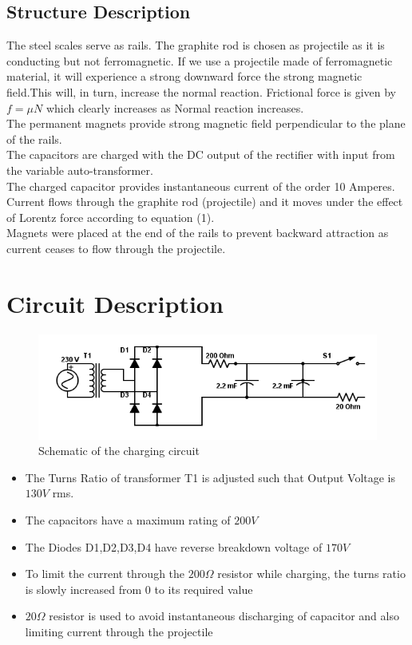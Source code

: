 \documentclass[twocolumn]{article}
\begin{document}
\subsection*{Structure Description}
\hspace{10mm}The steel scales serve as rails. The graphite rod is chosen as projectile as it is conducting but not ferromagnetic. If we use a projectile made of ferromagnetic material, it will experience a strong downward force the strong magnetic field.This will, in turn, increase the normal reaction. Frictional force is given by $f=\mu{}N$ which clearly increases as Normal reaction increases. \\
The permanent magnets provide strong magnetic field perpendicular to the plane of the rails. \\
The capacitors are charged with the DC output of the rectifier with input from the variable auto-transformer. \\ 
The charged capacitor provides instantaneous current of the order 10 Amperes. \\
Current flows through the graphite rod (projectile) and it moves under the effect of Lorentz force according to equation (1).\\
Magnets were placed at the end of the rails to prevent backward attraction as current ceases to flow through the projectile.

\section{Circuit Description}

\begin{figure}[htp]
	\caption{Schematic of the charging circuit}
	\includegraphics[width=\linewidth]{cktdiagram.png}
\end{figure}


\begin{itemize}
\item The Turns Ratio of transformer T1 is adjusted such that Output Voltage is $130V$ rms.
\item The capacitors have a maximum rating of $200V$
\item The Diodes D1,D2,D3,D4 have reverse breakdown voltage of $170V$
\item To limit the current through the $200\Omega$ resistor while charging, the turns ratio is slowly increased from 0 to its required value
\item $20\Omega$ resistor is used to avoid instantaneous discharging of capacitor and also limiting current through the projectile

\end{itemize}
\end{document}
